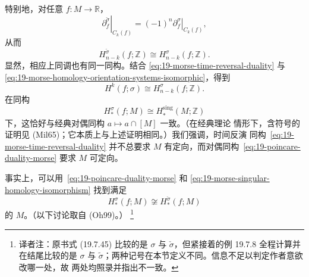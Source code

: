 特别地，对任意 $f:M\to\mathbb R$，
\begin{equation}
 \left.\partial_f^{\check\sigma}\right|_{C_k(f)}
 =(-1)^n\left.\partial_f^\sigma\right|_{C_k(f)},
\label{eq:19-boundary-orientation-system-sign}
\end{equation}
从而
\begin{equation}
 H_{n-k}^{\check\sigma}(f;\mathbb Z)
 \cong H_{n-k}^\sigma(f;\mathbb Z).
\label{eq:19-morse-homology-orientation-systems-isomorphic}
\end{equation}
显然，相应上同调也有同一同构。结合
\eqref{eq:19-morse-time-reversal-duality} 与
\eqref{eq:19-morse-homology-orientation-systems-isomorphic}，得到
\begin{equation}
 H^k(f;\sigma)\cong H_{n-k}^\sigma(f;\mathbb Z).
\label{eq:19-poincare-duality-morse}
\end{equation}
在同构
\begin{equation}
 H_*^\sigma(f;M)\cong H_*^{\mathrm{sing}}(M;\mathbb Z)
\label{eq:19-morse-singular-homology-isomorphism}
\end{equation}
下，这恰好与经典\personPoincare{}对偶同构 $a\mapsto a\cap[M]$ 一致。（在经典\personMorse{}理论
情形下，含符号的证明见 (Mil65)；它本质上与上述证明相同。）我们强调，时间反演
同构~\eqref{eq:19-morse-time-reversal-duality} 并不总要求 $M$ 有定向，而\personPoincare{}对偶同构~\eqref{eq:19-poincare-duality-morse} 要求 $M$ 可定向。

事实上，可以用~\eqref{eq:19-poincare-duality-morse} 和
\eqref{eq:19-morse-singular-homology-isomorphism} 找到满足
\begin{equation}
 H_*^\sigma(f;M)\not\cong H_*^{\check\sigma}(f;M)
\label{eq:19-two-morse-homologies-differ}
\end{equation}
的 $M$。（以下讨论取自 (Oh99)。）
\footnote{译者注：原书式 (19.7.45) 比较的是 $\sigma$ 与
$\check\sigma$，但紧接着的例 19.7.8 全程计算并在结尾比较的是 $\sigma$ 与
$\widetilde\sigma$；两种记号在本节定义不同。信息不足以判定作者意欲改哪一处，故
两处均照录并指出不一致。}


